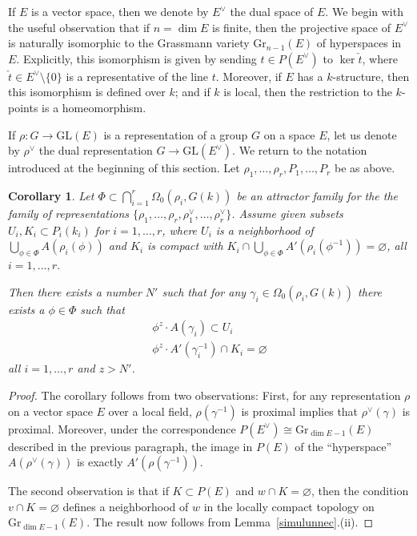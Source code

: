 \documentclass{amsart}
\theoremstyle{plain}
\newtheorem{corollary}[theorem]{Corollary}
\theoremstyle{definition}
\theoremstyle{remark}
\begin{document}
If $E$ is a vector space, then we denote by $E^{\vee}$ the dual space of $E$. We 
begin with the useful observation that if $n = \dim E$ is finite, then the projective space
of $E^{\vee}$ is naturally isomorphic to the Grassmann variety $\mathrm{Gr}_{n-1}(E)$
of
hyperspaces in $E$. Explicitly, this isomorphism is given by sending $t \in P(E^{\vee})$ to
$\ker \check{t}$, where $\check{t} \in E^{\vee}\setminus \{0\}$ is a
representative of the line $t$. Moreover, if $E$ has a
$k$-structure, then this isomorphism is defined over $k$; and if $k$ is local, then the
restriction to the $k$-points is a homeomorphism.

If $\rho: G \to \mathrm{GL}(E)$ is a representation of a group $G$ on a space $E$, let
us denote by $\rho^{\vee}$ the dual representation $G \to \mathrm{GL}(E^{\vee})$. We
return to the notation introduced at the beginning of this section. Let $\rho_{1},\ldots,
\rho_{r}, P_{1},\ldots, P_{r} $ be as above.
\begin{corollary}\label{attractfamily}
Let $\Phi \subset
\bigcap_{i = 1}^{r}\Omega_{0}(\rho_{i}, G(k))$
be an attractor
family for the the family of representations
$\{\rho_{1},\ldots, \rho_{r},\rho_{1}^{\vee},\ldots, \rho_{r}^{\vee}\}$.
Assume given subsets $U_{i}, K_{i} \subset P_{i}(k_{i})$ for $i = 1,\ldots, r$,
where $U_{i}$ is a neighborhood of $\bigcup_{\phi \in \Phi} A(\rho_{i}(\phi))$
and $K_{i}$ is compact with
$K_{i} \cap \bigcup_{\phi \in \Phi} A'(\rho_{i}(\phi^{-1})) = \varnothing$,
all $i = 1,\ldots, r$.

Then there exists a number $N'$ such that for any $\gamma_{i} \in
\Omega_{0}(\rho_{i}, G(k))$ there exists a $\phi \in \Phi$ such that
\begin{gather*}
\phi^{z}\cdot A(\gamma_{i}) \subset U_{i}\\
\phi^{z}\cdot A'(\gamma_{i}^{-1}) \cap K_{i} = \varnothing
\end{gather*}
all $i = 1,\ldots, r$ and $z > N'$.
\end{corollary}
\begin{proof}
The corollary follows from two observations: First, for any representation $\rho$ on a
vector space $E$ over a local field, $\rho(\gamma^{-1})$ is proximal implies that
$\rho^{\vee}(\gamma)$ is proximal. Moreover, under the correspondence $P(E^{\vee})
\cong \mathrm{Gr}_{\dim E -1}(E)$ described in the
previous paragraph, the image in $P(E)$ of the ``hyperspace'' $A(\rho^{\vee}(\gamma))$
is exactly $A'(\rho(\gamma^{-1}))$.

The second observation is that if $K\subset P(E)$ and $w \cap K = \varnothing$, then the
condition $v\cap K = \varnothing$ defines a neighborhood of $w$ in the locally compact
topology on $\mathrm{Gr}_{\dim E
-1}(E)$. The result now follows from Lemma~\ref{simulunnec}.(ii).
\end{proof}
\end{document}
